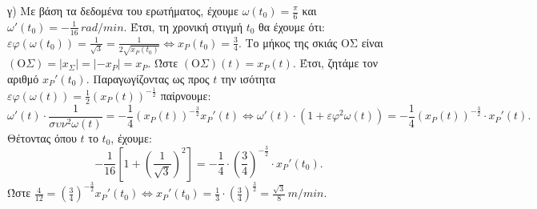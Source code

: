 γ) Με βάση τα δεδομένα του ερωτήματος, έχουμε $\omega(t_0) = \frac{\pi}{6}$ και $\omega'(t_0) = -\frac{1}{16}\,rad/min$.
Έτσι, τη χρονική στιγμή $t_0$ θα έχουμε ότι: $\varepsilon\varphi(\omega(t_0)) = \frac{1}{\sqrt{3}} = \frac{1}{2\sqrt{x_P(t_0)}} \Leftrightarrow x_P(t_0) = \frac{3}{4}$.
Το μήκος της σκιάς ΟΣ είναι $(\mathrm{O}\Sigma) = |x_\Sigma| = |-x_P| = x_P$.
Ώστε $(\mathrm{O}\Sigma)(t) = x_P(t)$.
Έτσι, ζητάμε τον αριθμό $x_P'(t_0)$.
Παραγωγίζοντας ως προς $t$ την ισότητα $\varepsilon\varphi(\omega(t)) = \frac{1}{2}(x_P(t))^{-\frac{1}{2}}$ παίρνουμε:
\[
\omega'(t) \cdot \frac{1}{\sigma\upsilon\nu^2\omega(t)} = -\frac{1}{4}(x_P(t))^{-\frac{3}{2}} x_P'(t) \Leftrightarrow \omega'(t) \cdot (1 + \varepsilon\varphi^2\omega(t)) = -\frac{1}{4}(x_P(t))^{-\frac{3}{2}} \cdot x_P'(t).
\]
Θέτοντας όπου $t$ το $t_0$, έχουμε:
\[
-\frac{1}{16}\left[ 1 + \left(\frac{1}{\sqrt{3}}\right)^2 \right] = -\frac{1}{4} \cdot \left(\frac{3}{4}\right)^{-\frac{3}{2}} \cdot x_P'(t_0).
\]
Ώστε $\frac{4}{12} = \left(\frac{3}{4}\right)^{-\frac{3}{2}} x_P'(t_0) \Leftrightarrow x_P'(t_0) = \frac{1}{3} \cdot \left(\frac{3}{4}\right)^{\frac{3}{2}} = \frac{\sqrt{3}}{8}\,m/min$.